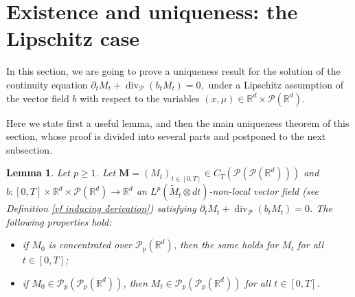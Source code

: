 \documentclass[10pt,leqno]{amsart}
\numberwithin{equation}{section}
\newtheorem{lemma}[teorema]{Lemma}
\newcommand{\R}{\mathbb{R}}
\newcommand{\PP}{\mathcal{P}}
\begin{document}
\section{Existence and uniqueness: the Lipschitz case}\label{uniqueness section} In this section, we are going to prove a uniqueness result for the solution of the continuity equation \(\partial_tM_t + \operatorname{div}_\PP(b_tM_t)=0,\) under a Lipschitz assumption of the vector field $b$ with respect to the variables $(x,\mu) \in\R^d \times \PP(\R^d)$. 

Here we state first a useful lemma, and then the main uniqueness theorem of this section, whose proof is divided into several parts and postponed to the next subsection.

\begin{lemma}\label{initial lemma section 6}
    Let $p\geq 1$. Let $\boldsymbol{M} = (M_t)_{t\in [0,T]} \in C_T(\PP(\PP(\R^d)))$ and $b:[0,T]\times \R^d \times \PP(\R^d)\to \R^d$ an $L^p(\widetilde{M}_t\otimes dt)$-non-local vector field (see Definition \ref{vf inducing derivation}) satisfying $\partial_t M_t + \operatorname{div}_\PP(b_tM_t) = 0$. The following properties hold:
    \begin{itemize}
        \item[(i)] if $M_0$ is concentrated over $\PP_p(\R^d)$, then the same holds for $M_t$ for all $t\in [0,T]$;
        \item[(ii)] if $M_0\in \PP_p(\PP_p(\R^d))$, then $M_t\in \PP_p(\PP_p(\R^d))$ for all $t\in [0,T]$.
    \end{itemize}
\end{lemma}
\end{document}
